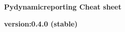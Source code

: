 \documentclass[9pt,landscape]{article}
\begin{document}
\raggedright
\footnotesize


\begin{center}
     \Huge{\textbf{Pydynamicreporting Cheat sheet}} \\
\end{center}
\begin{center}
  \small{\textbf{version:0.4.0 (stable)}} \\
\end{center}
\vspace{-0.15cm}
\noindent\makebox[\linewidth]{\rule{\paperwidth}{2pt}}
\end{document}
